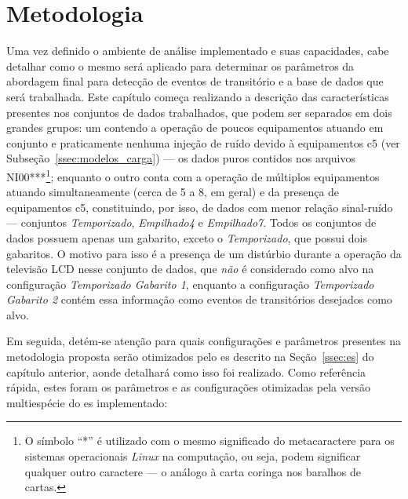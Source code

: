 \chapter{Metodologia}
\label{chap:metodologia}

Uma vez definido o ambiente de análise implementado e suas
capacidades, cabe detalhar como o mesmo será aplicado para
determinar os parâmetros da abordagem final para detecção de
eventos de transitório e a base de dados que será
trabalhada. Este capítulo começa realizando a descrição das
características presentes nos conjuntos de dados trabalhados, que
podem ser separados em dois grandes grupos: um contendo a operação de
poucos equipamentos atuando em conjunto e praticamente nenhuma
injeção de ruído devido à equipamentos \acs{c5} (ver
Subseção~\ref{ssec:modelos_carga}) --- os dados puros contidos nos
arquivos NI00***\footnote{O símbolo ``*'' é utilizado com o mesmo
significado do metacaractere para os sistemas operacionais
\emph{Linux} na computação, ou seja, podem significar qualquer outro
caractere --- o análogo à carta coringa nos baralhos de cartas.};
enquanto o outro conta com a operação de múltiplos equipamentos
atuando simultaneamente (cerca de 5 a 8, em geral) e da presença de
equipamentos \acs{c5}, constituindo, por isso, de dados com menor
relação sinal-ruído --- conjuntos \emph{Temporizado},
\emph{Empilhado4} e \emph{Empilhado7}. Todos os conjuntos de dados
possuem apenas um gabarito, exceto o \emph{Temporizado}, que possui
dois gabaritos. O motivo para isso é a presença de um distúrbio
durante a operação da televisão LCD nesse conjunto de dados, que
\emph{não} é considerado como alvo na configuração \emph{Temporizado
Gabarito 1}, enquanto a configuração \emph{Temporizado Gabarito 2}
contém essa informação como eventos de transitórios desejados como
alvo.


Em seguida, detém-se atenção para quais configurações e parâmetros
presentes na metodologia proposta serão otimizados pelo \acs{es}
descrito na Seção~\ref{ssec:es} do capítulo anterior, aonde detalhará
como isso foi realizado. Como referência rápida, estes foram os
parâmetros e as configurações otimizadas pela versão multiespécie do
\acs{es} implementado:

